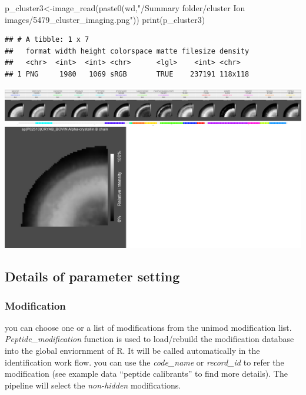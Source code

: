\documentclass[
]{article}
\newenvironment{Shaded}{\begin{snugshade}}{\end{snugshade}}
\newcommand{\FunctionTok}[1]{\textcolor[rgb]{0.00,0.00,0.00}{#1}}
\newcommand{\NormalTok}[1]{#1}
\newcommand{\OtherTok}[1]{\textcolor[rgb]{0.56,0.35,0.01}{#1}}
\newcommand{\StringTok}[1]{\textcolor[rgb]{0.31,0.60,0.02}{#1}}
\begin{document}
\begin{Shaded}
\begin{Highlighting}[]
\NormalTok{p\_cluster3}\OtherTok{\textless{}{-}}\FunctionTok{image\_read}\NormalTok{(}\FunctionTok{paste0}\NormalTok{(wd,}\StringTok{"/Summary folder/cluster Ion images/5479\_cluster\_imaging.png"}\NormalTok{))}
\FunctionTok{print}\NormalTok{(p\_cluster3)}
\end{Highlighting}
\end{Shaded}

\begin{verbatim}
## # A tibble: 1 x 7
##   format width height colorspace matte filesize density
##   <chr>  <int>  <int> <chr>      <lgl>    <int> <chr>  
## 1 PNG     1980   1069 sRGB       TRUE    237191 118x118
\end{verbatim}

\includegraphics[width=27.5in]{README_files/figure-latex/CLuster imaging-3}

\hypertarget{details-of-parameter-setting}{%
\subsection{Details of parameter
setting}\label{details-of-parameter-setting}}

\hypertarget{modification}{%
\subsubsection{Modification}\label{modification}}

you can choose one or a list of modifications from the unimod
modification list. \emph{Peptide\_modification} function is used to
load/rebuild the modification database into the global enviornment of R.
It will be called automatically in the identification work flow. you can
use the \emph{code\_name} or \emph{record\_id} to refer the modification
(see example data ``peptide calibrants'' to find more details). The
pipeline will select the \emph{non-hidden} modifications.
\end{document}
